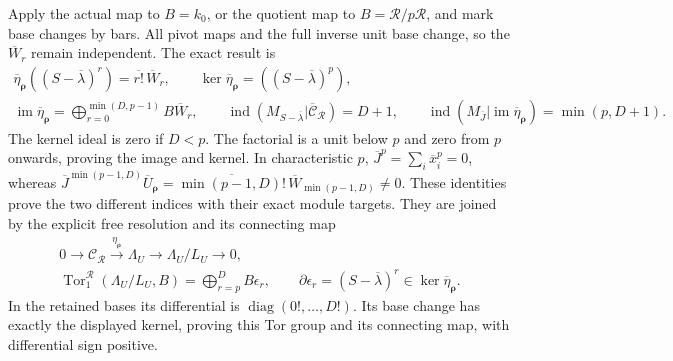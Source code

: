 Apply the actual map to \(B=k_0\), or the quotient map to
\(B=\mathscr R/p\mathscr R\), and mark base changes by bars.
All pivot maps and the full inverse unit base change, so the
\(\overline W_r\) remain independent.  The exact result is
\[
\begin{gathered}
 \overline\eta_{\boldsymbol\rho}((S-\overline\lambda)^r)
       =\overline{r!}\,\overline W_r,\qquad
 \ker\overline\eta_{\boldsymbol\rho}
       =((S-\overline\lambda)^p),\\
 \operatorname{im}\overline\eta_{\boldsymbol\rho}
       =\bigoplus_{r=0}^{\min(D,p-1)}B\overline W_r,
 \qquad
 \operatorname{ind}(M_{S-\overline\lambda}
          |\overline{\mathcal C}_{\mathscr R})=D+1,
 \qquad
 \operatorname{ind}(M_{\overline J}
          |\operatorname{im}\overline\eta_{\boldsymbol\rho})
       =\min(p,D+1).
\end{gathered}
\tag{PC30d}\label{eq:pc30d-update}
\]
The kernel ideal is zero if \(D<p\).  The factorial is a
unit below \(p\) and zero from \(p\) onwards, proving the
image and kernel.  In characteristic \(p\),
\(\overline J^p=\sum_i\overline x_i^{p}=0\), whereas
\(\overline J^{\min(p-1,D)}\overline U_{\boldsymbol\rho}
=\overline{\min(p-1,D)!}\,
\overline W_{\min(p-1,D)}\ne0\).  These identities prove
the two different indices with their exact module targets.
They are joined by the explicit free resolution and its
connecting map
\[
\begin{gathered}
 0\longrightarrow\mathcal C_{\mathscr R}
  \xrightarrow{\eta_{\boldsymbol\rho}}\Lambda_U
       \longrightarrow\Lambda_U/L_U\longrightarrow0,\\
 \operatorname{Tor}_1^{\mathscr R}(\Lambda_U/L_U,B)
       =\bigoplus_{r=p}^D B\epsilon_r,
 \qquad \partial\epsilon_r=(S-\overline\lambda)^r
       \in\ker\overline\eta_{\boldsymbol\rho}.
\end{gathered}
\tag{PC30e}\label{eq:pc30e-update}
\]
In the retained bases its differential is
\(\operatorname{diag}(0!,\ldots,D!)\).  Its base change
has exactly the displayed kernel, proving this Tor group
and its connecting map, with differential sign positive.

